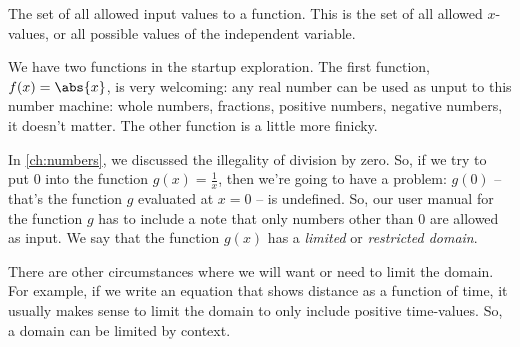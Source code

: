\begin{boxeddef}[Domain]
The set of all allowed input values to a function. This is the set of all allowed $x$-values, or all possible values of the independent variable.
\end{boxeddef}

We have two functions in the startup exploration. The first function, $f(x)=\abs{x}$, is very welcoming: any real number can be used as unput to this number machine: whole numbers, fractions, positive numbers, negative numbers, it doesn't matter. The other function is a little more finicky.

In \cref{ch:numbers}, we discussed the illegality of division by zero. So, if we try to put 0 into the function $g(x)=\frac{1}{x}$, then we're going to have a problem: $g(0)$ -- that's the function $g$ evaluated at $x=0$ -- is undefined. So, our user manual for the function $g$ has to include a note that only numbers other than 0 are allowed as input. We say that the function $g(x)$ has a \textit{limited} or \textit{restricted domain}.


There are other circumstances where we will want or need to limit the domain. For example, if we write an equation that shows distance as a function of time, it usually makes sense to limit the domain to only include positive time-values. So, a domain can be limited by context.


